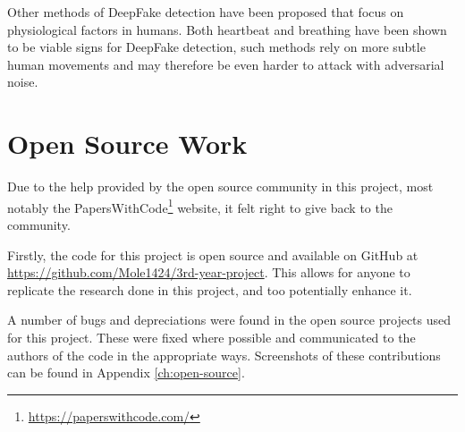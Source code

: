 Other methods of DeepFake detection have been proposed that focus on physiological factors in humans. Both heartbeat\cite{qi2020deeprhythm}\cite{hernandez2020deepfakeson} and breathing\cite{layton2024every} have been shown to be viable signs for DeepFake detection, such methods rely on more subtle human movements and may therefore be even harder to attack with adversarial noise.

\section{Open Source Work}


Due to the help provided by the open source community in this project, most notably the PapersWithCode\footnote{\url{https://paperswithcode.com/}} website, it felt right to give back to the community. 

Firstly, the code for this project is open source and available on GitHub at \url{https://github.com/Mole1424/3rd-year-project}. This allows for anyone to replicate the research done in this project, and too potentially enhance it. 

A number of bugs and depreciations were found in the open source projects used for this project. These were fixed where possible and communicated to the authors of the code in the appropriate ways. Screenshots of these contributions can be found in Appendix \ref{ch:open-source}.